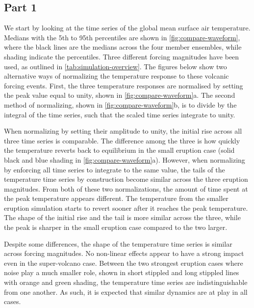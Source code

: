 \documentclass{ametsocV6.1}
\begin{document}
\subsection{Part 1}

We start by looking at the time series of the global mean surface air temperature.
Medians with the 5th to 95th percentiles are shown in \ref{fig:compare-waveform}, where
the black lines are the medians across the four member ensembles, while shading indicate
the percentiles. Three different forcing magnitudes have been used, as outlined in
\ref{tab:simulation-overview}. The figures below show two alternative ways of
normalizing the temperature response to these volcanic forcing events. First, the three
temperature responses are normalised by setting the peak value equal to unity, shown in
\ref{fig:compare-waveform}a. The second method of normalizing, shown in
\ref{fig:compare-waveform}b, is to divide by the integral of the time series, such that
the scaled time series integrate to unity.

When normalizing by setting their amplitude to unity, the initial rise across all three
time series is comparable. The difference among the three is how quickly the temperature
reverts back to equilibrium in the small eruption case (solid black and blue shading in
\ref{fig:compare-waveform}a). However, when normalizing by enforcing all time series to
integrate to the same value, the tails of the temperature time series by construction
become similar across the three eruption magnitudes. From both of these two
normalizations, the amount of time spent at the peak temperature appears different. The
temperature from the smaller eruption simulation starts to revert sooner after it
reaches the peak temperature. The shape of the initial rise and the tail is more similar
across the three, while the peak is sharper in the small eruption case compared to the
two larger.

Despite some differences, the shape of the temperature time series is similar across
forcing magnitudes. No non-linear effects appear to have a strong impact even in the
super-volcano case. Between the two strongest eruption cases where noise play a much
smaller role, shown in short stippled and long stippled lines with orange and green
shading, the temperature time series are indistinguishable from one another. As such, it
is expected that similar dynamics are at play in all cases.

\end{document}

